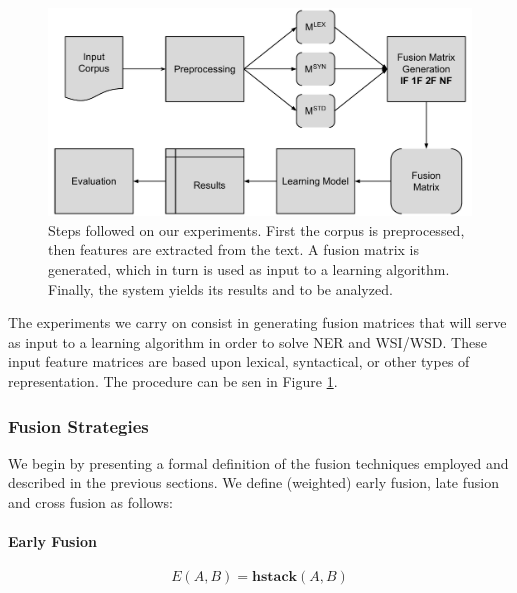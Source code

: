 


\begin{figure}[t]
\centering
\caption{Steps followed on our experiments. First the corpus is preprocessed, then features are extracted from the text. A fusion matrix is generated, which in turn is used as input to a learning algorithm. Finally, the system yields its results and to be analyzed.}
\includegraphics[width=0.85\linewidth]{images/Chapitre6/diag_metodo.pdf}

\label{fig:diagmetodo}
\end{figure}

The experiments we carry on consist in generating fusion matrices that will serve as input to a learning algorithm in order to solve NER and WSI/WSD. These input feature matrices are based upon lexical, syntactical, or other types of representation. The procedure can be sen in Figure \ref{fig:diagmetodo}.

\subsubsection{Fusion Strategies}
We begin by presenting a  formal definition of the fusion techniques employed and described in the previous sections. We define (weighted) early fusion, late fusion and cross fusion as follows:
\paragraph{Early Fusion}
\begin{equation}
E(A,B) = \mathbf{hstack}(A , B)
\end{equation}
